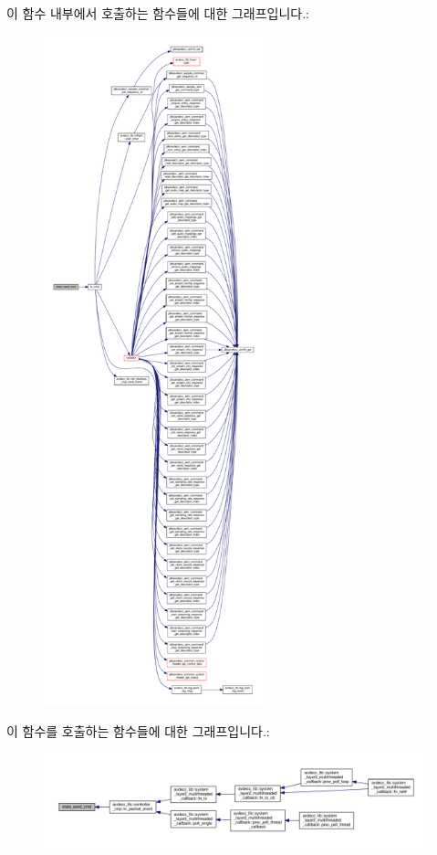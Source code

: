 이 함수 내부에서 호출하는 함수들에 대한 그래프입니다.\+:
\nopagebreak
\begin{figure}[H]
\begin{center}
\leavevmode
\includegraphics[height=550pt]{classavdecc__lib_1_1aecp__controller__state__machine_ab9da9129c9a77a914a7a8f9b2f291ff9_cgraph}
\end{center}
\end{figure}




이 함수를 호출하는 함수들에 대한 그래프입니다.\+:
\nopagebreak
\begin{figure}[H]
\begin{center}
\leavevmode
\includegraphics[width=350pt]{classavdecc__lib_1_1aecp__controller__state__machine_ab9da9129c9a77a914a7a8f9b2f291ff9_icgraph}
\end{center}
\end{figure}


